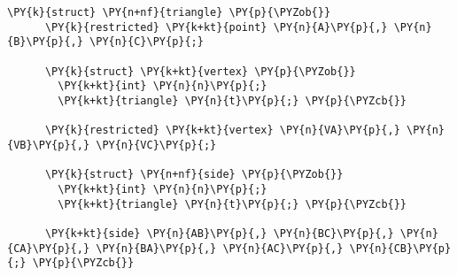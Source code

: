\begin{Verbatim}[commandchars=\\\{\}]
    \PY{k}{struct} \PY{n+nf}{triangle} \PY{p}{\PYZob{}}
      \PY{k}{restricted} \PY{k+kt}{point} \PY{n}{A}\PY{p}{,} \PY{n}{B}\PY{p}{,} \PY{n}{C}\PY{p}{;}

      \PY{k}{struct} \PY{k+kt}{vertex} \PY{p}{\PYZob{}}
        \PY{k+kt}{int} \PY{n}{n}\PY{p}{;}
        \PY{k+kt}{triangle} \PY{n}{t}\PY{p}{;} \PY{p}{\PYZcb{}}

      \PY{k}{restricted} \PY{k+kt}{vertex} \PY{n}{VA}\PY{p}{,} \PY{n}{VB}\PY{p}{,} \PY{n}{VC}\PY{p}{;}

      \PY{k}{struct} \PY{n+nf}{side} \PY{p}{\PYZob{}}
        \PY{k+kt}{int} \PY{n}{n}\PY{p}{;}
        \PY{k+kt}{triangle} \PY{n}{t}\PY{p}{;} \PY{p}{\PYZcb{}}

      \PY{k+kt}{side} \PY{n}{AB}\PY{p}{,} \PY{n}{BC}\PY{p}{,} \PY{n}{CA}\PY{p}{,} \PY{n}{BA}\PY{p}{,} \PY{n}{AC}\PY{p}{,} \PY{n}{CB}\PY{p}{;} \PY{p}{\PYZcb{}}
\end{Verbatim}
